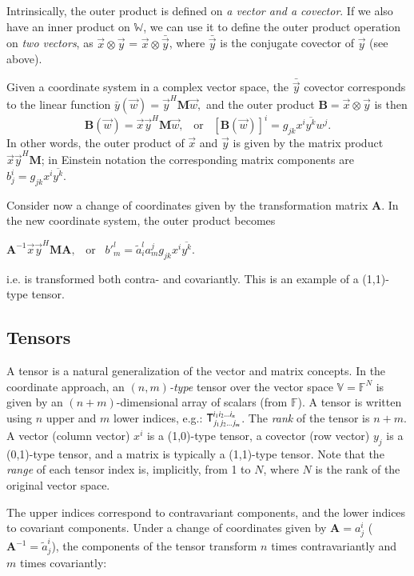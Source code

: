 \documentclass[]{aa}
\newcommand{\herm}{H}
\begin{document}
Intrinsically, the outer product is defined on \emph{a vector and a covector}. If we also have an inner product on $\mathbb{W}$, we can use it to define the outer product operation on \emph{two vectors}, as $\vec x\otimes \vec y$ = $\vec x\otimes \bar{\vec y}$, where $\bar{\vec y}$ is the conjugate covector of $\vec y$ (see above).

Given a coordinate system in a complex vector space, the $\bar{\vec y}$ covector corresponds to the linear function $\bar{y}(\vec w) = \vec y^\herm \mathbf{M} \vec w,$ and the outer product $\mathbf{B}=\vec x\otimes \vec y$ is then
\[
\mathbf{B}(\vec w) = \vec x \vec y^\herm \mathbf{M} \vec w, \;\;\;\mbox{or}\;\;\;[\mathbf{B}(\vec w)]^i = g_{jk} x^i \overline{y^k} w^j.
\]
In other words, the outer product of $\vec x$ and $\vec y$ is given by the matrix product $\vec x \vec y^\herm \mathbf{M}$; in Einstein notation the corresponding matrix components are $b^i_j = g_{jk} x^i \overline{y^k}.$ 

Consider now a change of coordinates given by the transformation matrix $\mathbf{A}$. In the new coordinate system, the outer product becomes

$\mathbf{A}^{-1}\vec x \vec y^\herm \mathbf{M} \mathbf{A}, \;\;\;\mbox{or}\;\;\;b'^{l}_{m} = \tilde a_i^{l}a_m^{j} g_{jk} x^i \overline{y^k}$.

i.e. is transformed both contra- and covariantly. This is an example of a (1,1)-type tensor.

\subsection{Tensors}
\label{sec:tensors}

A tensor is a natural generalization of the vector and matrix concepts. In the coordinate approach, an \emph{$(n,m)$-type} tensor over the vector space $\mathbb{V}=\mathbb{F}^N$ is given by an $(n+m)$-dimensional array of scalars (from $\mathbb{F}$). A tensor is written using $n$ upper and $m$ lower indices, e.g.: $\mathsf{T}_{j_{1}j_{2}...j_{m}}^{i_{1}i_{2}...i_{n}}$. The \emph{rank} of the tensor is $n+m$. A vector (column vector) $x^i$ is a (1,0)-type tensor, a covector (row vector) $y_j$ is a (0,1)-type tensor, and a matrix is typically a (1,1)-type tensor. Note that the \emph{range} of each tensor index is, implicitly, from 1 to $N$, where $N$ is the rank of the original vector space. 

The upper indices correspond to contravariant components, and the lower indices to covariant components. Under a change of coordinates given by $\mathbf{A}=a^i_j$ ($\mathbf{A}^{-1}=\tilde a^i_j$), the components of the tensor transform $n$ times contravariantly and $m$ times covariantly: 
\end{document}
